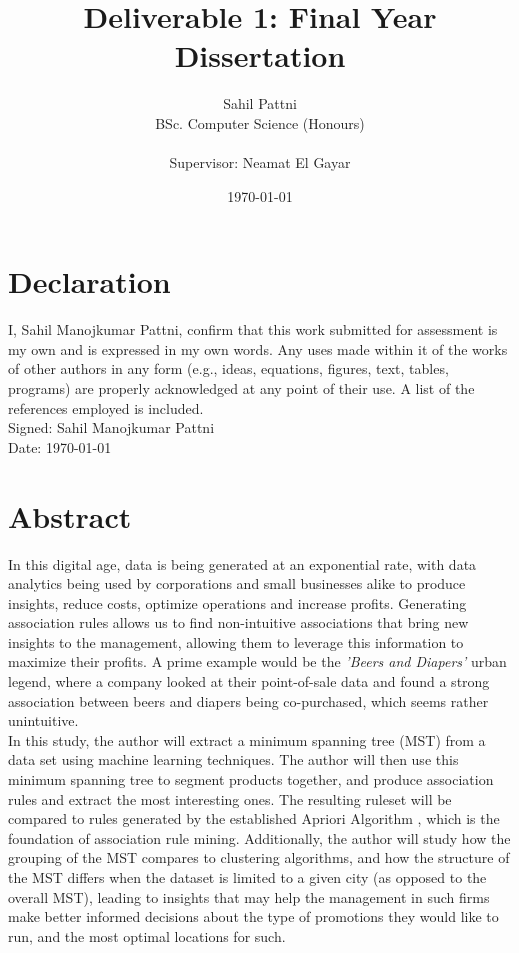\documentclass[a4paper,11pt]{article}
\begin{document}
\title{Deliverable 1: Final Year Dissertation}
\author{
	Sahil Pattni\\ 
	BSc. Computer Science (Honours)\\\\
	Supervisor: Neamat El Gayar
	}
\date{\today}
\maketitle
{}

\section*{Declaration} 
I, Sahil Manojkumar Pattni, confirm that this work submitted for assessment is my own and is expressed in my own words. Any uses made within it of the works of other authors in any form (e.g., ideas, equations, figures, text, tables, programs) are properly acknowledged at any point of their use. A list of the references employed is included. 
\\
Signed: Sahil Manojkumar Pattni\\
Date: \today
\newpage
\section*{Abstract}
In this digital age, data is being generated at an exponential rate, with data analytics being used by corporations and small businesses alike to produce insights, reduce costs, optimize operations and increase profits.  Generating association rules allows us to find non-intuitive associations that bring new insights to the management, allowing them to leverage this information to maximize their profits. A prime example would be the \textit{'Beers and Diapers'} urban legend, where a company looked at their point-of-sale data and found a strong association between beers and diapers being co-purchased, which seems rather unintuitive.\\
In this study, the author will extract a minimum spanning tree (MST) from a data set using machine learning techniques. The author will then use this minimum spanning tree to segment products together,  and produce association rules and extract the most interesting ones. The resulting ruleset will be compared to rules generated by the established Apriori Algorithm \cite{apriori}, which is the foundation of association rule mining.  Additionally, the author will study how the grouping of the MST compares to clustering algorithms, and how the structure of the MST differs when the dataset is limited to a given city (as opposed to the overall MST), leading to insights that may help the management in such firms make better informed decisions about the type of promotions they would like to run, and the most optimal locations for such.
\end{document}
